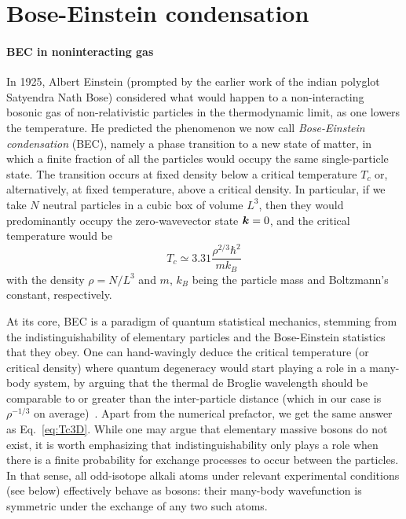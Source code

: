 \section{Bose-Einstein condensation}
\label{sec:BEC}


\paragraph{BEC in noninteracting gas}
In 1925, Albert Einstein (prompted by the earlier work of the indian
polyglot Satyendra Nath Bose) considered what would happen to a
non-interacting bosonic gas of non-relativistic particles in the
thermodynamic limit, as one lowers the temperature. He predicted the
phenomenon we now call \textit{Bose-Einstein condensation} (BEC),
namely a phase transition to a new state of matter, in which a finite
fraction of all the particles would occupy the same single-particle
state. The transition occurs at fixed density below a critical
temperature $T_c$ or, alternatively, at fixed temperature, above a
critical density. In particular, if we take $N$ neutral particles in a
cubic box of volume $L^3$, then they would predominantly occupy the
zero-wavevector state $\bm{k} = 0$, and the critical temperature would
be~\cite{9780198507192}
%
\begin{equation}\label{eq:Tc3D}
  T_c \simeq 3.31 \frac{\rho^{2/3}\hbar^2}{m k_B}
\end{equation}
%
with the density $\rho = N/L^3$ and $m$, $k_B$ being the particle
mass and Boltzmann's constant, respectively.

At its core, BEC is a paradigm of quantum statistical mechanics,
stemming from the indistinguishability of elementary particles and the
Bose-Einstein statistics that they obey. One can hand-wavingly deduce
the critical temperature (or critical density) where quantum
degeneracy would start playing a role in a many-body system, by
arguing that the thermal de Broglie wavelength should be comparable to
or greater than the inter-particle distance (which in our case is
$\rho^{-1/3}$ on average)~\cite{Leggett_1999}. Apart from the
numerical prefactor, we get the same answer as
Eq.~\eqref{eq:Tc3D}. While one may argue that elementary massive
bosons do not exist, it is worth emphasizing that indistinguishability
only plays a role when there is a finite probability for exchange
processes to occur between the particles. In that sense, all
odd-isotope alkali atoms under relevant experimental conditions (see
below) effectively behave as bosons: their many-body wavefunction is
symmetric under the exchange of any two such atoms.

